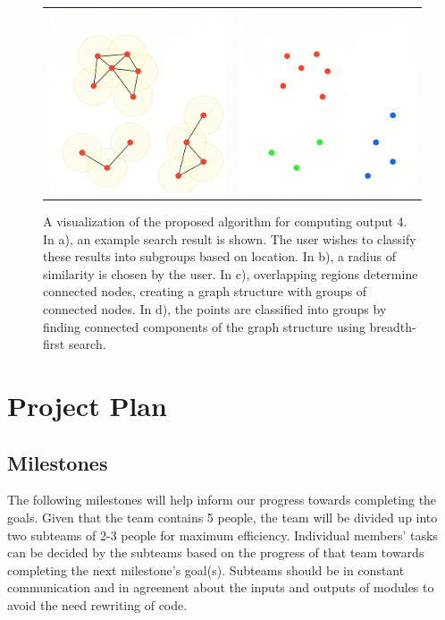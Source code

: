\documentclass{article}
\begin{document}
\begin{figure}[p]
\begin{tabular}{ p{79mm}p{79mm} }
\includegraphics[width=78mm,frame=0.01cm]{Large/Fig3.png} & \includegraphics[width=78mm,frame=0.01cm]{Large/Fig4.png}
\end{tabular}
\caption{A visualization of the proposed algorithm for computing output 4. In a), an example search result is shown. The user wishes to classify these results into subgroups based on location. In b), a radius of similarity is chosen by the user. In c), overlapping regions determine connected nodes, creating a graph structure with groups of connected nodes. In d), the points are classified into groups by finding connected components of the graph structure using breadth-first search.}
\label{fig:Groupings}
\end{figure}
\fi %

\clearpage
\section{Project Plan}
\subsection{Milestones}
The following milestones will help inform our progress towards completing the goals. Given that the team contains 5 people, the team will be divided up into two subteams of 2-3 people for maximum efficiency. Individual members' tasks can be decided by the subteams based on the progress of that team towards completing the next milestone's goal(s). Subteams should be in constant communication and in agreement about the inputs and outputs of modules to avoid the need rewriting of code.
\end{document}
